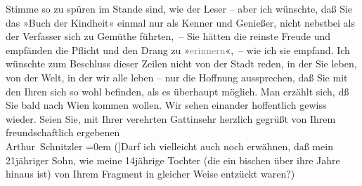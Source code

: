 \begin{ledgroupsized}[t]{13cm}
                    Stimme so zu spüren im Stande sind, wie der Leser – aber ich wünschte, daß Sie
                    das »Buch der Kindheit« einmal nur als Kenner und Genießer, nicht nebstbei als
                    der Verfasser sich zu Gemüthe führten, – Sie hätten die reinste Freude und
                    empfänden die Pflicht und den Drang zu »\textcolor{gray}{erinnern}«, – wie ich
                    sie empfand.\pend
           \pstart
           Ich wünschte zum Beschluss dieser Zeilen {\pb}nicht von der Stadt
                    reden, in der Sie leben, von der Welt, in der wir alle leben – nur die Hoffnung
                    aussprechen, daß Sie mit den Ihren sich so wohl befinden, als es überhaupt
                    möglich. Man erzählt sich, dß Sie bald nach Wien
                    kommen wollen. Wir sehen einander hoffentlich gewiss wieder.\pend
           \pstart
           Seien Sie, mit Ihrer verehrten Gattinsehr herzlich gegrüßt von Ihrem{\\[\baselineskip]}freundschaftlich ergebenen{\\[\baselineskip]}\spacefill\mbox{Arthur Schnitzler}\pend
           \leftskip=0em{}\pstart
           \noindent{}{[}({]}Darf ich vielleicht auch noch erwähnen, daß mein
                        21jähriger Sohn, wie
                        meine 14jährige Tochter
                        (die ein bischen über ihre Jahre hinaus ist) von Ihrem Fragment in gleicher Weise entzückt
                        waren?) \pend
           \endnumbering{}\end{ledgroupsized}  \newcommand{\dateiname}{L02404}\newcommand{\titel}{Arthur Schnitzler an Thomas Mann, 18. 11. 1923}\newcommand{\editorInnen}{Martin Anton Müller und Gerd-Hermann Susen}
      